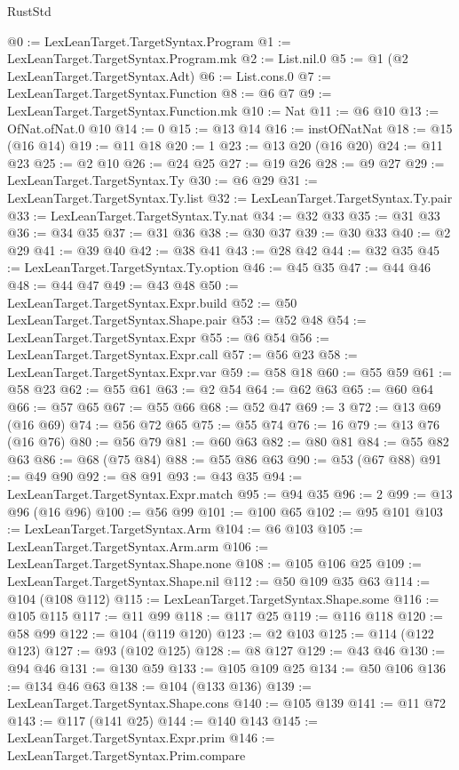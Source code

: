 \begin{lexlean}{RustStd}
\begin{coremodule}
{\begin{coremodule}
{{{{{{{{{{{{{{{{{{{{{{{{{{{{{{{{{{{@0 := LexLeanTarget.TargetSyntax.Program
@1 := LexLeanTarget.TargetSyntax.Program.mk
@2 := List.nil.{0}
@5 := @1 (@2 LexLeanTarget.TargetSyntax.Adt)
@6 := List.cons.{0}
@7 := LexLeanTarget.TargetSyntax.Function
@8 := @6 @7
@9 := LexLeanTarget.TargetSyntax.Function.mk
@10 := Nat
@11 := @6 @10
@13 := OfNat.ofNat.{0} @10
@14 := 0
@15 := @13 @14
@16 := instOfNatNat
@18 := @15 (@16 @14)
@19 := @11 @18
@20 := 1
@23 := @13 @20 (@16 @20)
@24 := @11 @23
@25 := @2 @10
@26 := @24 @25
@27 := @19 @26
@28 := @9 @27
@29 := LexLeanTarget.TargetSyntax.Ty
@30 := @6 @29
@31 := LexLeanTarget.TargetSyntax.Ty.list
@32 := LexLeanTarget.TargetSyntax.Ty.pair
@33 := LexLeanTarget.TargetSyntax.Ty.nat
@34 := @32 @33
@35 := @31 @33
@36 := @34 @35
@37 := @31 @36
@38 := @30 @37
@39 := @30 @33
@40 := @2 @29
@41 := @39 @40
@42 := @38 @41
@43 := @28 @42
@44 := @32 @35
@45 := LexLeanTarget.TargetSyntax.Ty.option
@46 := @45 @35
@47 := @44 @46
@48 := @44 @47
@49 := @43 @48
@50 := LexLeanTarget.TargetSyntax.Expr.build
@52 := @50 LexLeanTarget.TargetSyntax.Shape.pair
@53 := @52 @48
@54 := LexLeanTarget.TargetSyntax.Expr
@55 := @6 @54
@56 := LexLeanTarget.TargetSyntax.Expr.call
@57 := @56 @23
@58 := LexLeanTarget.TargetSyntax.Expr.var
@59 := @58 @18
@60 := @55 @59
@61 := @58 @23
@62 := @55 @61
@63 := @2 @54
@64 := @62 @63
@65 := @60 @64
@66 := @57 @65
@67 := @55 @66
@68 := @52 @47
@69 := 3
@72 := @13 @69 (@16 @69)
@74 := @56 @72 @65
@75 := @55 @74
@76 := 16
@79 := @13 @76 (@16 @76)
@80 := @56 @79
@81 := @60 @63
@82 := @80 @81
@84 := @55 @82 @63
@86 := @68 (@75 @84)
@88 := @55 @86 @63
@90 := @53 (@67 @88)
@91 := @49 @90
@92 := @8 @91
@93 := @43 @35
@94 := LexLeanTarget.TargetSyntax.Expr.match
@95 := @94 @35
@96 := 2
@99 := @13 @96 (@16 @96)
@100 := @56 @99
@101 := @100 @65
@102 := @95 @101
@103 := LexLeanTarget.TargetSyntax.Arm
@104 := @6 @103
@105 := LexLeanTarget.TargetSyntax.Arm.arm
@106 := LexLeanTarget.TargetSyntax.Shape.none
@108 := @105 @106 @25
@109 := LexLeanTarget.TargetSyntax.Shape.nil
@112 := @50 @109 @35 @63
@114 := @104 (@108 @112)
@115 := LexLeanTarget.TargetSyntax.Shape.some
@116 := @105 @115
@117 := @11 @99
@118 := @117 @25
@119 := @116 @118
@120 := @58 @99
@122 := @104 (@119 @120)
@123 := @2 @103
@125 := @114 (@122 @123)
@127 := @93 (@102 @125)
@128 := @8 @127
@129 := @43 @46
@130 := @94 @46
@131 := @130 @59
@133 := @105 @109 @25
@134 := @50 @106
@136 := @134 @46 @63
@138 := @104 (@133 @136)
@139 := LexLeanTarget.TargetSyntax.Shape.cons
@140 := @105 @139
@141 := @11 @72
@143 := @117 (@141 @25)
@144 := @140 @143
@145 := LexLeanTarget.TargetSyntax.Expr.prim
@146 := LexLeanTarget.TargetSyntax.Prim.compare
}}}}}}}}}}}}}}}}}}}}}}}}}}}}}}}}}}}
\end{coremodule}}
\end{coremodule}
\end{lexlean}
